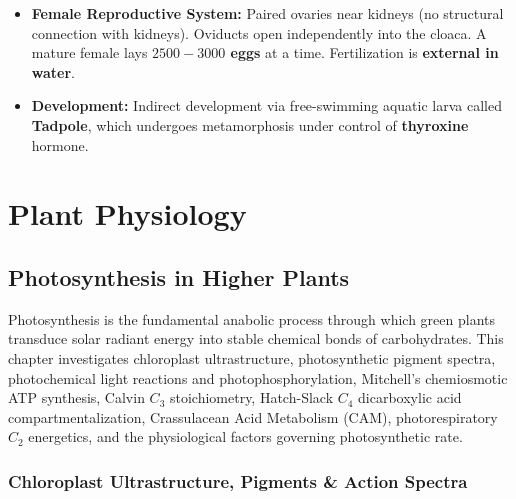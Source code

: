 \documentclass[10pt,twoside,openright]{book}
\begin{document}
\begin{conceptbox}
\begin{itemize}
  \item \textbf{Female Reproductive System:} Paired ovaries near kidneys (no structural connection with kidneys). Oviducts open independently into the cloaca. A mature female lays \textbf{$2500-3000$ eggs} at a time. Fertilization is \textbf{external in water}.
  \item \textbf{Development:} Indirect development via free-swimming aquatic larva called \textbf{Tadpole}, which undergoes metamorphosis under control of \textbf{thyroxine} hormone.
\end{itemize}
\end{conceptbox}


\part{Plant Physiology}

\chapter{Photosynthesis in Higher Plants}

Photosynthesis is the fundamental anabolic process through which green plants transduce solar radiant energy into stable chemical bonds of carbohydrates. This chapter investigates chloroplast ultrastructure, photosynthetic pigment spectra, photochemical light reactions and photophosphorylation, Mitchell's chemiosmotic ATP synthesis, Calvin $C_3$ stoichiometry, Hatch-Slack $C_4$ dicarboxylic acid compartmentalization, Crassulacean Acid Metabolism (CAM), photorespiratory $C_2$ energetics, and the physiological factors governing photosynthetic rate.

\section{Chloroplast Ultrastructure, Pigments \& Action Spectra}
\end{document}
